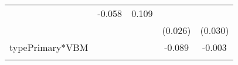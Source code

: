 \documentclass[12pt,twoside]{reedthesis}
\begin{document}
\begin{longtable}[]{@{}lcccc@{}}
\begin{minipage}[t]{0.18\columnwidth}
  \strut
  \end{minipage} & \begin{minipage}[t]{0.20\columnwidth}\centering\strut
  -0.058\strut
  \end{minipage} & \begin{minipage}[t]{0.11\columnwidth}\centering\strut
  0.109\strut
  \end{minipage}\tabularnewline
  \begin{minipage}[t]{0.23\columnwidth}\raggedright\strut
  \strut
  \end{minipage} & \begin{minipage}[t]{0.14\columnwidth}\centering\strut
  \strut
  \end{minipage} & \begin{minipage}[t]{0.18\columnwidth}\centering\strut
  \strut
  \end{minipage} & \begin{minipage}[t]{0.20\columnwidth}\centering\strut
  (0.026)\strut
  \end{minipage} & \begin{minipage}[t]{0.11\columnwidth}\centering\strut
  (0.030)\strut
  \end{minipage}\tabularnewline
  \begin{minipage}[t]{0.23\columnwidth}\raggedright\strut
  typePrimary*VBM\strut
  \end{minipage} & \begin{minipage}[t]{0.14\columnwidth}\centering\strut
  \strut
  \end{minipage} & \begin{minipage}[t]{0.18\columnwidth}\centering\strut
  \strut
  \end{minipage} & \begin{minipage}[t]{0.20\columnwidth}\centering\strut
  -0.089\strut
  \end{minipage} & \begin{minipage}[t]{0.11\columnwidth}\centering\strut
  -0.003\strut
  \end{minipage}\tabularnewline
  \begin{minipage}[t]{0.23\columnwidth}\raggedright\strut
  \strut
  \end{minipage} & \begin{minipage}[t]{0.14\columnwidth}\centering\strut
  \strut
  \end{minipage} & \begin{minipage}[t]{0.18\columnwidth}\centering\strut
  \strut
  \end{minipage} & \begin{minipage}[t]{0.20\columnwidth}\centering\strut

\end{minipage}
\end{longtable}
\end{document}
